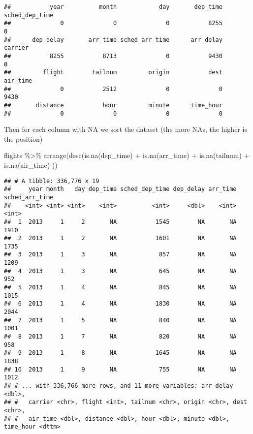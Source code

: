 \documentclass[
]{article}
\newenvironment{Shaded}{\begin{snugshade}}{\end{snugshade}}
\newcommand{\FunctionTok}[1]{\textcolor[rgb]{0.00,0.00,0.00}{#1}}
\newcommand{\NormalTok}[1]{#1}
\newcommand{\SpecialCharTok}[1]{\textcolor[rgb]{0.00,0.00,0.00}{#1}}
\begin{document}
\begin{verbatim}
##           year          month            day       dep_time sched_dep_time 
##              0              0              0           8255              0 
##      dep_delay       arr_time sched_arr_time      arr_delay        carrier 
##           8255           8713              0           9430              0 
##         flight        tailnum         origin           dest       air_time 
##              0           2512              0              0           9430 
##       distance           hour         minute      time_hour 
##              0              0              0              0
\end{verbatim}

Then for each column with NA we sort the dataset (the more NAs, the
higher is the position)

\begin{Shaded}
\begin{Highlighting}[]
\NormalTok{flights }\SpecialCharTok{\%\textgreater{}\%} \FunctionTok{arrange}\NormalTok{(}\FunctionTok{desc}\NormalTok{(}\FunctionTok{is.na}\NormalTok{(dep\_time) }\SpecialCharTok{+}
                         \FunctionTok{is.na}\NormalTok{(arr\_time) }\SpecialCharTok{+}
                         \FunctionTok{is.na}\NormalTok{(tailnum)  }\SpecialCharTok{+}
                         \FunctionTok{is.na}\NormalTok{(air\_time) ))}
\end{Highlighting}
\end{Shaded}

\begin{verbatim}
## # A tibble: 336,776 x 19
##     year month   day dep_time sched_dep_time dep_delay arr_time sched_arr_time
##    <int> <int> <int>    <int>          <int>     <dbl>    <int>          <int>
##  1  2013     1     2       NA           1545        NA       NA           1910
##  2  2013     1     2       NA           1601        NA       NA           1735
##  3  2013     1     3       NA            857        NA       NA           1209
##  4  2013     1     3       NA            645        NA       NA            952
##  5  2013     1     4       NA            845        NA       NA           1015
##  6  2013     1     4       NA           1830        NA       NA           2044
##  7  2013     1     5       NA            840        NA       NA           1001
##  8  2013     1     7       NA            820        NA       NA            958
##  9  2013     1     8       NA           1645        NA       NA           1838
## 10  2013     1     9       NA            755        NA       NA           1012
## # ... with 336,766 more rows, and 11 more variables: arr_delay <dbl>,
## #   carrier <chr>, flight <int>, tailnum <chr>, origin <chr>, dest <chr>,
## #   air_time <dbl>, distance <dbl>, hour <dbl>, minute <dbl>, time_hour <dttm>
\end{verbatim}
\end{document}
